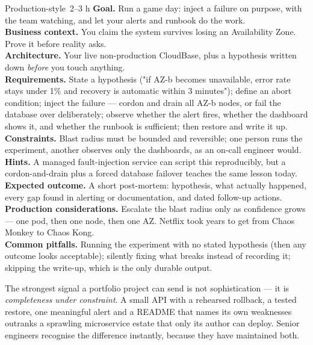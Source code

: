 \begin{minilab}{Production-style}{~2--3 h}
\textbf{Goal.} Run a game day: inject a failure on purpose, with the team watching, and let your alerts and runbook do the work.\\
\textbf{Business context.} You claim the system survives losing an Availability Zone. Prove it before reality asks.\\
\textbf{Architecture.} Your live non-production CloudBase, plus a hypothesis written down \emph{before} you touch anything.\\
\textbf{Requirements.} State a hypothesis ("if AZ-b becomes unavailable, error rate stays under 1\% and recovery is automatic within 3 minutes"); define an abort condition; inject the failure --- cordon and drain all AZ-b nodes, or fail the database over deliberately; observe whether the alert fires, whether the dashboard shows it, and whether the runbook is sufficient; then restore and write it up.\\
\textbf{Constraints.} Blast radius must be bounded and reversible; one person runs the experiment, another observes only the dashboards, as an on-call engineer would.\\
\textbf{Hints.} A managed fault-injection service can script this reproducibly, but a cordon-and-drain plus a forced database failover teaches the same lesson today.\\
\textbf{Expected outcome.} A short post-mortem: hypothesis, what actually happened, every gap found in alerting or documentation, and dated follow-up actions.\\
\textbf{Production considerations.} Escalate the blast radius only as confidence grows --- one pod, then one node, then one AZ. Netflix took years to get from Chaos Monkey to Chaos Kong.\\
\textbf{Common pitfalls.} Running the experiment with no stated hypothesis (then any outcome looks acceptable); silently fixing what breaks instead of recording it; skipping the write-up, which is the only durable output.
\end{minilab}


\begin{seniornote}
The strongest signal a portfolio project can send is not sophistication --- it is \emph{completeness under constraint}. A small API with a rehearsed rollback, a tested restore, one meaningful alert and a README that names its own weaknesses outranks a sprawling microservice estate that only its author can deploy. Senior engineers recognise the difference instantly, because they have maintained both.
\end{seniornote}

